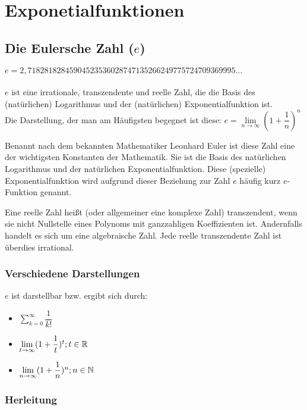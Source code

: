 \chapter{Exponetialfunktionen}

		\section{Die Eulersche Zahl ($e$)}

\begin{Definition}
$e = 2,71828182845904523536028747135266249775724709369995...$\\
\\
$e$ ist eine irrationale, transzendente und reelle Zahl, die die Basis des (natürlichen) Logarithmus und der (natürlichen) Exponentialfunktion ist.\\
Die Darstellung, der man am Häufigsten begegnet ist diese:
$e=\lim\limits_{n\to \infty}(1+\dfrac{1}{n})^n$
\end{Definition}
Benannt nach dem bekannten Mathematiker Leonhard Euler ist diese Zahl eine der wichtigsten Konstanten der Mathematik.
Sie ist die Basis des natürlichen Logarithmus und der natürlichen Exponentialfunktion. Diese (spezielle) Exponentialfunktion wird aufgrund dieser Beziehung zur Zahl $e$ häufig kurz $e$-Funktion genannt.
\begin{Definition}
  Eine reelle Zahl heißt (oder allgemeiner eine komplexe Zahl) transzendent,
  wenn sie nicht Nullstelle eines Polynoms mit ganzzahligen Koeffizienten ist.
  Andernfalls handelt es sich um eine algebraische Zahl. Jede reelle transzendente Zahl ist überdies irrational.
\end{Definition}

	\subsection{Verschiedene Darstellungen}

$e$ ist darstellbar bzw. ergibt sich durch:
\begin{itemize}
\item $\sum\limits_{k=0}^{\infty}\dfrac{1}{k!}$
\item $\lim\limits_{t\to \infty}(1+\dfrac{1}{t})^t;t\in\mathbb{R}$
\item $\lim\limits_{n\to \infty}(1+\dfrac{1}{n})^n;n\in\mathbb{N}$
\end{itemize}

	\subsection{Herleitung}

